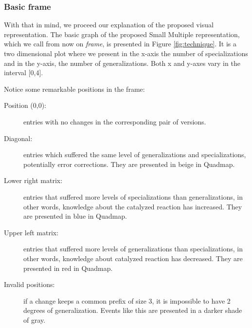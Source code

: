 \subsubsection{Basic frame}

With that in mind, we proceed our explanation of the proposed visual representation. The basic graph of the proposed Small Multiple representation, which we call from now on \textit{frame}, is presented in Figure \ref{fig:technique}. It is a two dimensional plot where we present in the x-axis the number of specializations and in the y-axis, the number of generalizations. Both x and y-axes vary in the interval [0,4].

Notice some remarkable positions in the frame:

\begin{description}
\item [Position (0,0):] entries with no changes in the corresponding pair of versions.
\item [Diagonal:] entries which suffered the same level of generalizations and specializations, potentially error corrections. They are presented in beige in Quadmap.
\item [Lower right matrix:] entries that suffered more levels of specializations than generalizations, in other words, knowledge about the catalyzed reaction has increased. They are presented in blue in Quadmap.
\item [Upper left matrix:] entries that suffered more levels of generalizations than specializations, in other words, knowledge about catalyzed reaction has decreased. They are presented in red in Quadmap.
\item [Invalid positions: ] if a change keeps a common prefix of size 3, it is impossible to have 2 degrees of generalization. Events like this are presented in a darker shade of gray.
\end{description}

